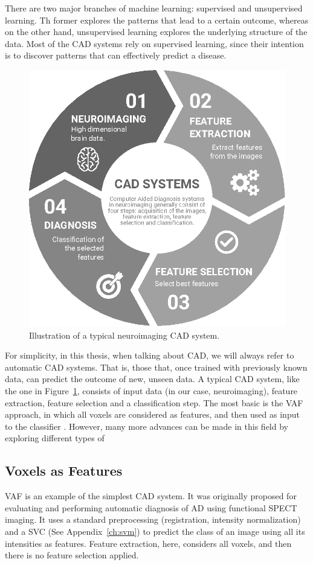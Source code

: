 There are two major branches of machine learning: supervised and unsupervised learning. Th former explores the patterns that lead to a certain outcome, whereas on the other hand, unsupervised learning explores the underlying structure of the data. Most of the \ac{CAD} systems rely on supervised learning, since their intention is to discover patterns that can effectively predict a disease. 

\begin{figure}[htp]
	\centering
	\includegraphics[width=0.5\linewidth]{Graphics/ch2/NI-CAD}
	\caption[Illustration of a typical neuroimaging CAD system.]{Illustration of a typical neuroimaging CAD system.}
	\label{fig:ni-cad}
\end{figure}

For simplicity, in this thesis, when talking about \ac{CAD}, we will always refer to automatic \ac{CAD} systems. That is, those that, once trained with previously known data, can predict the outcome of new, unseen data. A typical \ac{CAD} system, like the one in Figure~\ref{fig:ni-cad}, consists of input data (in our case, neuroimaging), feature extraction, feature selection and a classification step. The most basic is the \acf{VAF} approach, in which all voxels are considered as features, and then used as input to the classifier \cite{Stoeckel04}. However, many more advances can be made in this field by exploring different types of 

\subsection{Voxels as Features}
\acf{VAF} \cite{Stoeckel04} is an example of the simplest \ac{CAD} system. It was originally proposed for evaluating and performing automatic diagnosis of \ac{AD} using functional \ac{SPECT} imaging. It uses a standard preprocessing (registration, intensity normalization) and a \ac{SVC} (See Appendix~\ref{ch:svm}) to predict the class of an image using all its intensities as features. Feature extraction, here, considers all voxels, and then there is no feature selection applied. 

